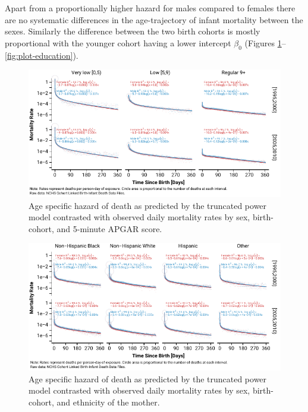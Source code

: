 \documentclass[10pt, twoside, parskip=half]{article}
\makeatletter
\def\maxwidth{\ifdim\Gin@nat@width>\linewidth\linewidth
  \else\Gin@nat@width\fi}
\let\Oldincludegraphics\includegraphics
\renewcommand{\includegraphics}[1]{\Oldincludegraphics[width=\maxwidth]{#1}}
\makeatother
\begin{document}
Apart from a proportionally higher hazard for males compared to females
there are no systematic differences in the age-trajectory of infant
mortality between the sexes. Similarly the difference between the two
birth cohorts is mostly proportional with the younger cohort having a
lower intercept \(\beta_0\) (Figures
\ref{fig:plot-apgar}--\ref{fig:plot-education}).

\begin{figure}
\centering
\includegraphics{fig/figure4.pdf}
\caption{\label{fig:plot-apgar}Age specific hazard of death as predicted by
the truncated power model contrasted with observed daily mortality rates
by sex, birth-cohort, and 5-minute APGAR score.}
\end{figure}

\begin{figure}
\centering
\includegraphics{fig/figure5.pdf}
\caption{\label{fig:plot-origin}Age specific hazard of death as predicted by
the truncated power model contrasted with observed daily mortality rates
by sex, birth-cohort, and ethnicity of the mother.}
\end{figure}
\end{document}
